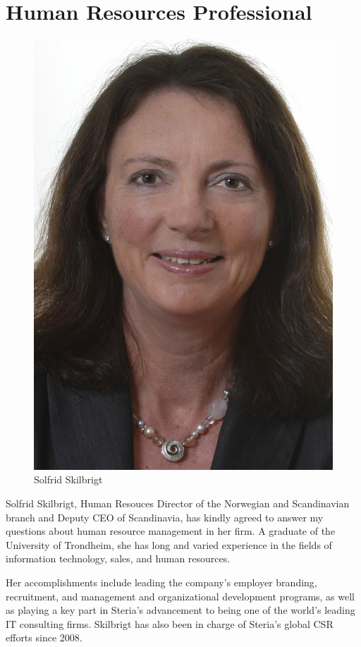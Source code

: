 \documentclass[letterpaper, 12pt]{report}
\begin{document}
\section{Human Resources Professional}
\begin{figure}
	\centering
	\includegraphics[width=\textwidth]{solfrid}
	\caption*{Solfrid Skilbrigt}
\end{figure}
Solfrid Skilbrigt, Human Resouces Director of the Norwegian and Scandinavian branch and Deputy CEO of Scandinavia, has kindly agreed to answer my questions about human resource management in her firm. 
A graduate of the University of Trondheim, she has long and varied experience in the fields of information technology, sales, and human resources.

Her accomplishments include leading the company's employer branding, recruitment, and management and organizational development programs, as well as playing a key part in Steria's advancement to being one of the world's leading IT consulting firms. 
Skilbrigt has also been in charge of Steria's global CSR efforts since 2008.
\end{document}
